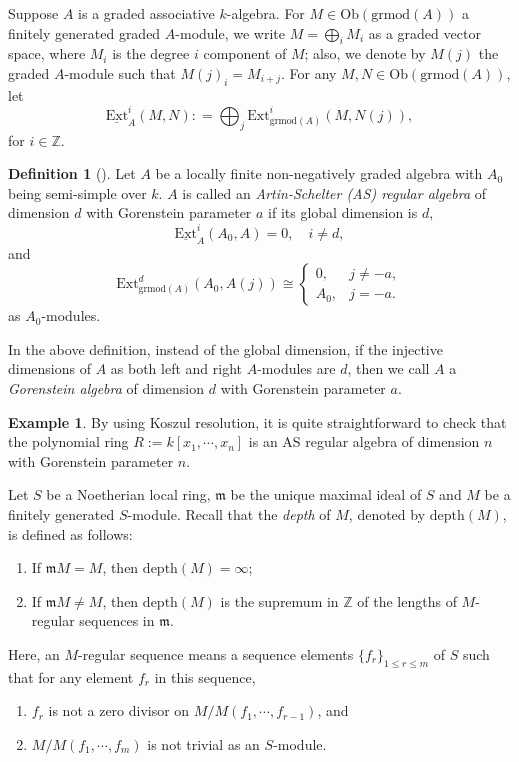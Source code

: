 \documentclass[11pt,reqno]{amsart}
\theoremstyle{definition}
\newtheorem{example}[theorem]{Example}
\newtheorem{definition}[theorem]{Definition}
\begin{document}
Suppose $A$ is a graded associative $k$-algebra.
For $M \in \mathrm{Ob}(\mathrm{grmod}(A))$
a finitely generated graded $A$-module, we write 
$M = \bigoplus_{i} M_{i}$ as a graded vector space, 
where $M_{i}$ is the degree $i$ component of $M$; also, we denote by $M(j)$ 
the graded $A$-module such that $M(j)_{i} = M_{i+j}$. 
For any $M, N \in \mathrm{Ob}(\mathrm{grmod}(A))$, let
$$
\mathrm{\underline{Ext}}_{A}^{i}(M, N) : = \bigoplus_{j} 
\mathrm{Ext}_{\mathrm{grmod}(A)}^{i}(M, N(j)),
$$
for $i \in \mathbb{Z}$.

\begin{definition}[\cite{AS}]
Let $A$ be a locally finite 
non-negatively graded algebra
with
$A_0$ being semi-simple over $k$.	
$A$ is called an {\it Artin-Schelter (AS) regular algebra} of 
dimension $d$ with
Gorenstein parameter $a$ 
if
its global dimension is $d$,  
$$
\mathrm{\underline{Ext}}^{i}_{A}(A_{0}, A) = 0, \quad i\neq d,
$$	
and
$$
\mathrm{Ext}^{d}_{\mathrm{grmod}(A)}(A_{0}, A(j)) 
\cong
\left\{
\begin{array}{cl}0,&j \neq -a,\\
A_{0},&j=-a.
\end{array}
\right.
$$
as $A_0$-modules. 
\end{definition}

In the above definition,
instead of the global dimension, 
if the injective dimensions
of $A$ as both left and right $A$-modules are $d$,
then we call $A$ a {\it Gorenstein algebra} of  
dimension $d$ with
Gorenstein parameter $a$. 

\begin{example}
By using Koszul resolution, it is quite straightforward to check that 
the polynomial ring
$R:=k[x_1,\cdots, x_n]$ is an AS regular algebra of dimension $n$
with Gorenstein parameter $n$. 
\end{example}

Let $S$ be a Noetherian local ring, $\mathfrak{m}$ be the unique maximal 
ideal of $S$
and $M$ be a finitely generated $S$-module. Recall that the 
{\it depth} of $M$, denoted by $\mathrm{depth}(M)$,
is defined as follows:
\begin{enumerate}
\item If $\mathfrak{m}M = M$, then $\mathrm{depth}(M) = \infty$;

\item If $\mathfrak{m}M \neq M$, then $\mathrm{depth}(M)$ is the 
supremum in $\mathbb{Z}$ of the lengths of
$M$-regular sequences in $\mathfrak{m}$.
\end{enumerate}
Here, an $M$-regular sequence means a sequence elements 
$\{f_r \}_{1 \leq r \leq m}$ of $S$ such that for any 
element $f_r$ in this sequence, 
\begin{enumerate}
\item[(1)] $f_r$ is not a zero divisor on 
$M/ M(f_{1}, \cdots, f_{r-1})$, and 
\item[(2)] $M/ M(f_{1}, \cdots, f_{m})$
is not trivial as an $S$-module. 
\end{enumerate}
\end{document}

